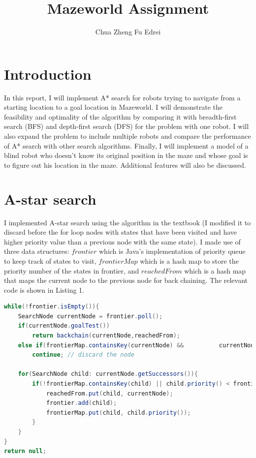 \documentclass[9.5pt]{extarticle}
\title{Mazeworld Assignment}
\author{Chua Zheng Fu Edrei}
\begin{document}
\maketitle

\section{Introduction}

In this report, I will implement A* search for robots trying to navigate from a starting location to a goal location in Mazeworld. I will demonstrate the feasibility and optimality of the algorithm by comparing it with breadth-first search (BFS) and depth-first search (DFS) for the problem with one robot. I will also expand the problem to include multiple robots and compare the performance of A* search with other search algorithms. Finally, I will implement a model of a blind robot who doesn't know its original position in the maze and whose goal is to figure out his location in the maze. Additional features will also be discussed.


\section{A-star search}

I implemented A-star search using the algorithm in the textbook (I modified it to discard before the for loop nodes with states that have been visited and have higher priority value than a previous node with the same state). I made use of three data structures: $frontier$ which is Java's implementation of priority queue to keep track of states to visit, $frontierMap$ which is a hash map to store the priority number of the states in frontier, and $reachedFrom$ which is a hash map that maps the current node to the previous node for back chaining. The relevant code is shown in Listing 1.

\begin{lstlisting}[language=java,caption={Java code for A-star search}]
while(!frontier.isEmpty()){
	SearchNode currentNode = frontier.poll();
	if(currentNode.goalTest())
		return backchain(currentNode,reachedFrom);
	else if(frontierMap.containsKey(currentNode) && 		 currentNode.priority()>frontierMap.get(currentNode))
		continue; // discard the node

	for(SearchNode child: currentNode.getSuccessors()){
		if(!frontierMap.containsKey(child) || child.priority() < frontierMap.get(child)){
			reachedFrom.put(child, currentNode);
			frontier.add(child);
			frontierMap.put(child, child.priority());
		}
	}
}
return null;
\end{lstlisting}
\end{document}

